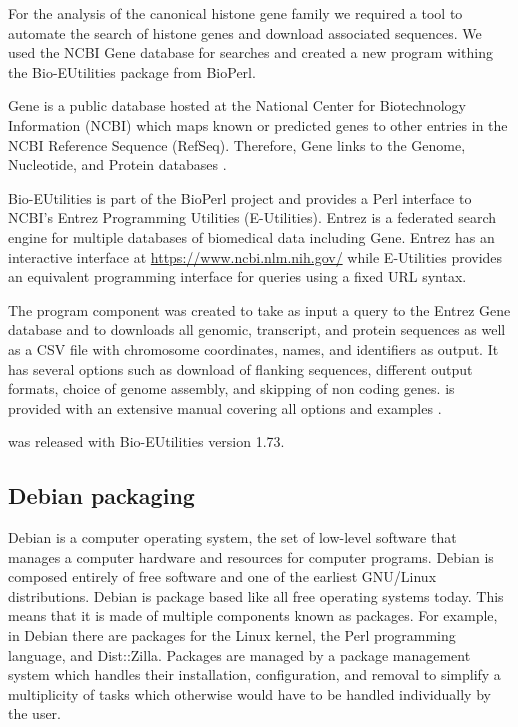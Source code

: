 For the analysis of the canonical histone gene
family  we required a tool to
automate the search of histone genes and download associated sequences.
We used the NCBI Gene database for searches and
created a new program withing the Bio-EUtilities package from BioPerl.

Gene is a public database hosted at the National Center for
Biotechnology Information (NCBI) which maps known or predicted genes
to other entries in the NCBI Reference Sequence (RefSeq).  Therefore, Gene
links to the Genome, Nucleotide, and Protein databases \citep{gene-database}.

Bio-EUtilities is part of the BioPerl project and provides a Perl
interface to NCBI's Entrez Programming Utilities (E-Utilities).
Entrez is a federated search engine for multiple databases of
biomedical data including Gene.  Entrez has an
interactive interface at \url{https://www.ncbi.nlm.nih.gov/} while
E-Utilities provides an equivalent
programming interface for queries using a fixed
URL syntax.

The program  component was
created to take as input a query to the Entrez Gene database and
to downloads all genomic, transcript, and protein sequences as well
as a CSV file with chromosome coordinates, names, and identifiers as output.
It has several options such as download of flanking sequences, different
output formats, choice of genome assembly, and skipping of non coding
genes.  
is provided with an extensive manual covering all options
and examples .

 was released with
Bio-EUtilities version 1.73.

\subsection{Debian packaging}

Debian is a computer operating system, the set of low-level software
that manages a computer hardware and resources for computer programs.
Debian is
composed entirely of free software and one of the earliest GNU/Linux
distributions.
Debian is package based like all free operating systems today.
This means that it is made of multiple components known as
packages.  For example, in Debian there are packages for the Linux
kernel, the Perl programming language, and Dist::Zilla.  Packages are
managed by a package management system which handles their
installation, configuration, and removal to simplify
a multiplicity of tasks which otherwise would
have to be handled individually by the user.

